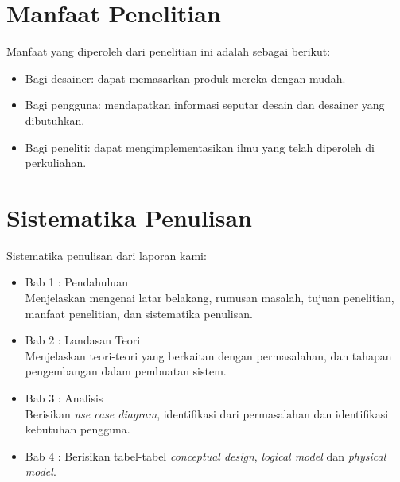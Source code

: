 \section{Manfaat Penelitian}
Manfaat yang diperoleh dari penelitian ini adalah sebagai berikut:
\begin{itemize}
	\item Bagi desainer: dapat memasarkan produk mereka dengan mudah.
	\item Bagi pengguna: mendapatkan informasi seputar desain dan desainer yang dibutuhkan.
	\item Bagi peneliti: dapat mengimplementasikan ilmu yang telah diperoleh di perkuliahan.
\end{itemize}

\section{Sistematika Penulisan}
Sistematika penulisan dari laporan kami:
\begin{itemize}
	\item Bab 1 : Pendahuluan \\ Menjelaskan mengenai latar belakang, rumusan masalah, tujuan penelitian, manfaat penelitian, dan sistematika penulisan.
	\item Bab 2 : Landasan Teori \\ Menjelaskan teori-teori yang berkaitan dengan permasalahan, dan tahapan pengembangan dalam pembuatan sistem.
	\item Bab 3 : Analisis \\ Berisikan \textit{use case diagram}, identifikasi dari permasalahan dan identifikasi kebutuhan pengguna.
	\item Bab 4 : Berisikan tabel-tabel \textit{conceptual design}, \textit{logical model} dan \textit{physical model}.
\end{itemize}